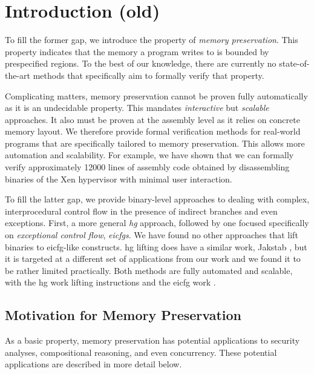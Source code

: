 \chapter{Introduction (old)}

To fill the former gap, we introduce the property of \emph{memory preservation}.
This property indicates that the memory a program writes to is bounded by prespecified regions.
To the best of our knowledge, there are currently no state-of-the-art methods that specifically aim to formally verify that property.

Complicating matters, memory preservation cannot be proven fully automatically as it is an undecidable property.
This mandates \emph{interactive} but \emph{scalable} approaches.
It also must be proven at the assembly level as it relies on concrete memory layout.
We therefore provide formal verification methods for real-world programs that are specifically tailored to memory preservation.
This allows more automation and scalability.
For example, we have shown that we can formally verify approximately \num{12000} lines of assembly code obtained by disassembling binaries of the Xen hypervisor \autocite{xen} with minimal user interaction.

To fill the latter gap, we provide binary-level approaches to dealing with complex, interprocedural control flow in the presence of indirect branches and even exceptions.
First, a more general \emph{\ac{hg}} approach, followed by one focused specifically on \emph{exceptional control flow}, \emph{\acp{eicfg}}.
We have found no other approaches that lift binaries to \ac{eicfg}-like constructs.
\Ac{hg} lifting does have a similar work, Jakstab \autocite{kinder2010static,kinder2012alternating,kinder2012virtualization}, but it is targeted at a different set of applications from our work and we found it to be rather limited practically.
Both methods are fully automated and scalable, with the \ac{hg} work lifting  instructions and the \ac{eicfg} work .

\section{Motivation for Memory Preservation}
As a basic property, memory preservation has potential applications to security analyses, compositional reasoning, and even concurrency.
These potential applications are described in more detail below.

